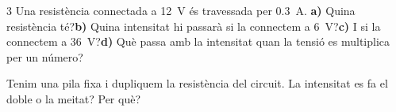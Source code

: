 \begin{exercici}{3}
Una resistència connectada a \SI{12}{V} és travessada per \SI{0,3}{A}.
\textbf{a)} Quina resistència té?\quad \textbf{b)} Quina intensitat hi passarà si la connectem a \SI{6}{V}?\quad \textbf{c)} I si la connectem a \SI{36}{V}?\quad \textbf{d)} Què passa amb la intensitat quan la tensió es multiplica per un número?
\end{exercici}

\begin{comprova}
Tenim una pila fixa i dupliquem la resistència del circuit. La intensitat es fa el doble o la meitat? Per què?
\end{comprova}
